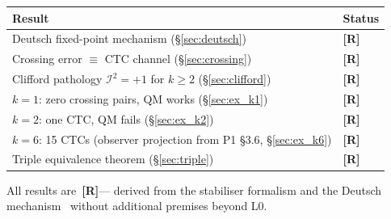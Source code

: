 \documentclass[11pt,a4paper]{article}
\newcommand{\Rmark}{\textcolor{green!50!black}{\textbf{[R]}}}
\begin{document}
\begin{center}
\renewcommand{\arraystretch}{1.25}
\begin{tabular}{ll}
\toprule
\textbf{Result} & \textbf{Status} \\
\midrule
Deutsch fixed-point mechanism (\S\ref{sec:deutsch})       & \Rmark \\
Crossing error $\equiv$ CTC channel (\S\ref{sec:crossing})& \Rmark \\
Clifford pathology $\mathcal{I}^2=+1$ for $k\geq2$ (\S\ref{sec:clifford})
                                                          & \Rmark \\
$k=1$: zero crossing pairs, QM works (\S\ref{sec:ex_k1})  & \Rmark \\
$k=2$: one CTC, QM fails (\S\ref{sec:ex_k2})              & \Rmark \\
$k=6$: 15 CTCs (observer projection from P1 \S3.6, \S\ref{sec:ex_k6})
                                                          & \Rmark \\
Triple equivalence theorem (\S\ref{sec:triple})           & \Rmark \\
\bottomrule
\end{tabular}
\end{center}

\noindent
All results are~\Rmark --- derived from the stabiliser formalism and the Deutsch mechanism~\cite{Deutsch1991} without additional premises beyond L0.



\end{document}
